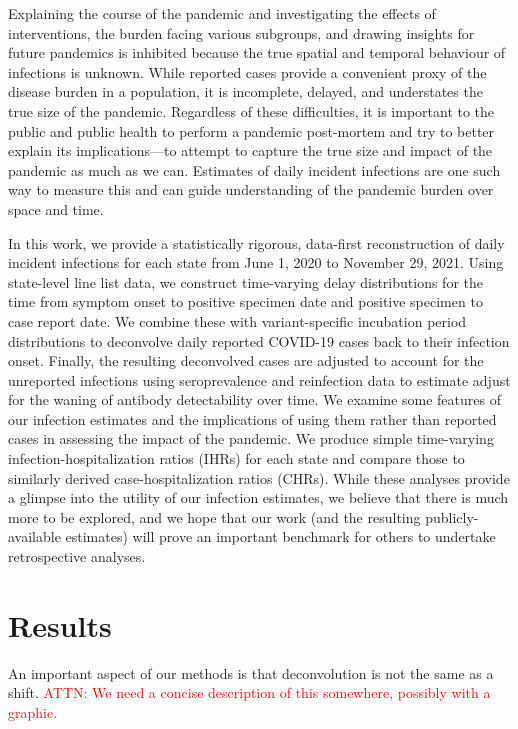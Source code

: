 \documentclass{article}
\newcommand{\attn }[1]{\textcolor{red}{ATTN: #1}}
\begin{document}
Explaining the course of the pandemic and investigating the effects of
interventions, the burden facing various subgroups, and drawing insights for
future pandemics is inhibited because the true spatial and temporal behaviour of
infections is unknown. While reported cases provide a convenient proxy of the
disease burden in a population, it is incomplete, delayed, and understates the
true size of the pandemic. Regardless of these difficulties, it is important to
the public and public health to perform a pandemic post-mortem and try to better
explain its implications---to attempt to capture the true size and impact of the
pandemic as much as we can. Estimates of daily incident infections are one such
way to measure this and can guide understanding of the pandemic burden over
space and time.

In this work, we provide a statistically rigorous, data-first reconstruction of
daily incident infections for each \US state from June 1, 2020 to November 29,
2021. Using state-level line list data, we construct time-varying delay
distributions for the time from symptom onset to positive specimen date and
positive specimen to case report date. We combine these with variant-specific
incubation period distributions to deconvolve daily reported COVID-19 cases back
to their infection onset. Finally, the resulting deconvolved cases are adjusted
to account for the unreported infections using seroprevalence and reinfection
data to estimate adjust for the waning of antibody detectability over time. We
examine some features of our infection estimates and the implications of using
them rather than reported cases in assessing the impact of the pandemic. We
produce simple time-varying infection-hospitalization ratios (IHRs) for each
state and compare those to similarly derived case-hospitalization ratios (CHRs).
While these analyses provide a glimpse into the utility of our infection
estimates, we believe that there is much more to be explored, and we hope that
our work (and the resulting publicly-available estimates) will prove an
important benchmark for others to undertake retrospective analyses.




\section{Results}
\label{sec:results}

An important aspect of our methods is that deconvolution is not the same as a
shift. \attn{We need a concise description of this somewhere, possibly with a
graphic.}
\end{document}
